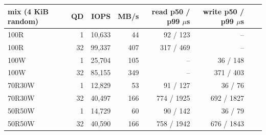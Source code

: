 \begin{tabular}{lrrrrrrr}
\toprule
mix (4 KiB random) & QD & IOPS & MB/s & read p50 / p99 $\mu$s & write p50 / p99 $\mu$s \\
\midrule
100R & 1 & 10,633 & 44 & 92 / 123 & -- \\
100R & 32 & 99,337 & 407 & 317 / 469 & -- \\
100W & 1 & 25,704 & 105 & -- & 36 / 148 \\
100W & 32 & 85,155 & 349 & -- & 371 / 403 \\
70R30W & 1 & 12,829 & 53 & 91 / 127 & 36 / 76 \\
70R30W & 32 & 40,497 & 166 & 774 / 1925 & 692 / 1827 \\
50R50W & 1 & 14,729 & 60 & 90 / 142 & 36 / 79 \\
50R50W & 32 & 40,590 & 166 & 758 / 1942 & 676 / 1843 \\
\bottomrule
\end{tabular}
